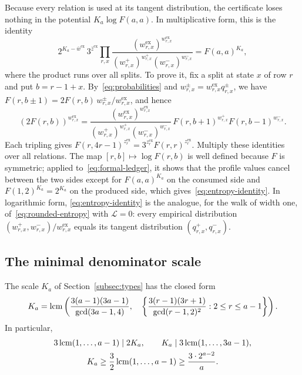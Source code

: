 Because every relation is used at its tangent distribution, the
certificate loses nothing in the potential \(K_a\log F(a,a)\). In
multiplicative form, this is the identity
\begin{equation}\label{eq:entropy-identity}
 2^{K_a-\bar w^{\mathrm{ex}}}\,3^{\bar z^{\mathrm{ex}}}
 \prod_{r,x}\frac{(w^{\mathrm{ex}}_{r,x})^{w^{\mathrm{ex}}_{r,x}}}
 {(w^+_{r,x})^{w^+_{r,x}}(w^-_{r,x})^{w^-_{r,x}}}
 =F(a,a)^{K_a},
\end{equation}
where the product runs over all splits. To prove it, fix a split at
state \(x\) of row \(r\) and put \(b=r-1+x\). By~\eqref{eq:probabilities}
and \(w^\pm_{r,x}=w^{\mathrm{ex}}_{r,x}q^\pm_{r,x}\), we have
\(F(r,b\pm1)=2F(r,b)\,w^\pm_{r,x}/w^{\mathrm{ex}}_{r,x}\), and hence
\[
 (2F(r,b))^{w^{\mathrm{ex}}_{r,x}}=
 \frac{(w^{\mathrm{ex}}_{r,x})^{w^{\mathrm{ex}}_{r,x}}}
 {(w^+_{r,x})^{w^+_{r,x}}(w^-_{r,x})^{w^-_{r,x}}}
 \,F(r,b+1)^{w^+_{r,x}}F(r,b-1)^{w^-_{r,x}}.
\]
Each tripling gives
\(F(r,4r-1)^{z^{\mathrm{ex}}_r}=3^{z^{\mathrm{ex}}_r}F(r,r)^{z^{\mathrm{ex}}_r}\).
Multiply these identities over all relations. The map
\([r,b]\mapsto\log F(r,b)\) is well defined because \(F\) is symmetric;
applied to~\eqref{eq:formal-ledger}, it shows that the profile values
cancel between the two sides except for \(F(a,a)^{K_a}\) on the consumed
side and \(F(1,2)^{K_a}=2^{K_a}\) on the produced side, which
gives~\eqref{eq:entropy-identity}. In logarithmic form,
\eqref{eq:entropy-identity} is the analogue, for the walk of width one,
of~\eqref{eq:rounded-entropy} with \(\mathcal L=0\): every empirical
distribution \((w^+_{r,x},w^-_{r,x})/w^{\mathrm{ex}}_{r,x}\) equals its
tangent distribution \((q^+_{r,x},q^-_{r,x})\).

\subsection{The minimal denominator scale}

\begin{theorem}\label{thm:normalization}
The scale \(K_a\) of Section~\ref{subsec:types} has the closed form
\begin{equation}\label{eq:minimal-scale}
 K_a=\operatorname{lcm}\left(
 \frac{3(a-1)(3a-1)}{\gcd(3a-1,4)},\quad
 \left\{\frac{3(r-1)(3r+1)}{\gcd(r-1,2)^2}:2\le r\le a-1\right\}
 \right).
\end{equation}
In particular,
\begin{gather}
 3\operatorname{lcm}(1,\ldots,a-1)\mid 2K_a,
 \qquad K_a\mid3\operatorname{lcm}(1,\ldots,3a-1),\label{eq:scale-divisibility}\\
 K_a\ge\frac32\operatorname{lcm}(1,\ldots,a-1)\ge\frac{3\cdot2^{a-2}}a.
 \label{eq:scale-growth}
\end{gather}
\end{theorem}

